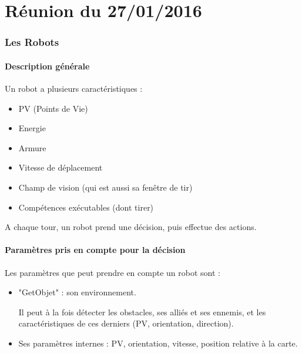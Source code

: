 \documentclass[10pt]{article}
\begin{document}
\part*{{Réunion du 27/01/2016}}

\renewcommand{\contentsname}{Sommaire}
\tableofcontents





\newpage

\section{Les Robots}

\subsection{Description générale}

Un robot a plusieurs caractéristiques : 

\begin{itemize}
\item PV (Points de Vie)
\item Energie
\item Armure
\item Vitesse de déplacement
\item Champ de vision (qui est aussi sa fenêtre de tir)
\item Compétences exécutables (dont tirer)

\end{itemize}

A chaque tour, un robot prend une décision, puis effectue des actions.



\subsection{Paramètres pris en compte pour la décision}

Les paramètres que peut prendre en compte un robot sont :
\begin{itemize}

\item "GetObjet" : son environnement.

Il peut à la fois détecter les obstacles, ses alliés et ses ennemis, et les caractéristiques de ces derniers (PV, orientation, direction).

\item Ses paramètres internes : PV, orientation, vitesse, position relative à la carte. 

\end{itemize}
\end{document}
